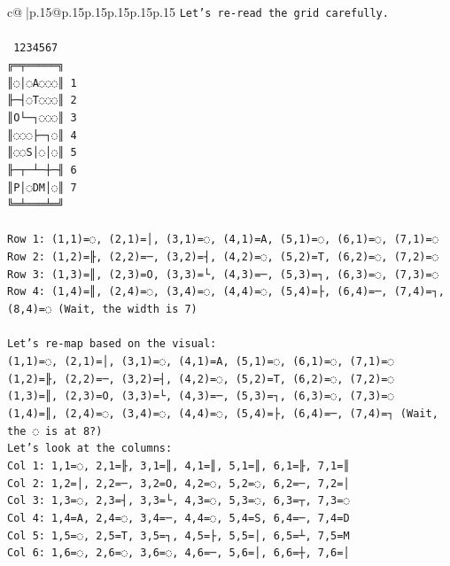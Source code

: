 \documentclass{article}
\begin{document}
{\begin{supertabular}{c@{$\;$}|p{.15\linewidth}@{}p{.15\linewidth}p{.15\linewidth}p{.15\linewidth}p{.15\linewidth}p{.15\linewidth}}
{{{\texttt{Let's re{-}read the grid carefully.} \\
\\ 
\texttt{ 1234567} \\
\texttt{╔═╤═════╗} \\
\texttt{║◌│◌A◌◌◌║ 1} \\
\texttt{╟─┤◌T◌◌◌║ 2} \\
\texttt{║O└─┐◌◌◌║ 3} \\
\texttt{║◌◌◌├─┐◌║ 4} \\
\texttt{║◌◌S│◌│◌║ 5} \\
\texttt{╟─┬─┴─┼─╢ 6} \\
\texttt{║P│◌DM│◌║ 7} \\
\texttt{╚═╧═══╧═╝} \\
\\ 
\texttt{Row 1: (1,1)=◌, (2,1)=│, (3,1)=◌, (4,1)=A, (5,1)=◌, (6,1)=◌, (7,1)=◌} \\
\texttt{Row 2: (1,2)=╟, (2,2)=─, (3,2)=┤, (4,2)=◌, (5,2)=T, (6,2)=◌, (7,2)=◌} \\
\texttt{Row 3: (1,3)=║, (2,3)=O, (3,3)=└, (4,3)=─, (5,3)=┐, (6,3)=◌, (7,3)=◌} \\
\texttt{Row 4: (1,4)=║, (2,4)=◌, (3,4)=◌, (4,4)=◌, (5,4)=├, (6,4)=─, (7,4)=┐, (8,4)=◌ (Wait, the width is 7)} \\
\\ 
\texttt{Let's re{-}map based on the visual:} \\
\texttt{(1,1)=◌, (2,1)=│, (3,1)=◌, (4,1)=A, (5,1)=◌, (6,1)=◌, (7,1)=◌} \\
\texttt{(1,2)=╟, (2,2)=─, (3,2)=┤, (4,2)=◌, (5,2)=T, (6,2)=◌, (7,2)=◌} \\
\texttt{(1,3)=║, (2,3)=O, (3,3)=└, (4,3)=─, (5,3)=┐, (6,3)=◌, (7,3)=◌} \\
\texttt{(1,4)=║, (2,4)=◌, (3,4)=◌, (4,4)=◌, (5,4)=├, (6,4)=─, (7,4)=┐ (Wait, the ◌ is at 8?)} \\
\texttt{Let's look at the columns:} \\
\texttt{Col 1: 1,1=◌, 2,1=╟, 3,1=║, 4,1=║, 5,1=║, 6,1=╟, 7,1=║} \\
\texttt{Col 2: 1,2=│, 2,2=─, 3,2=O, 4,2=◌, 5,2=◌, 6,2=─, 7,2=│} \\
\texttt{Col 3: 1,3=◌, 2,3=┤, 3,3=└, 4,3=◌, 5,3=◌, 6,3=┬, 7,3=◌} \\
\texttt{Col 4: 1,4=A, 2,4=◌, 3,4=─, 4,4=◌, 5,4=S, 6,4=─, 7,4=D} \\
\texttt{Col 5: 1,5=◌, 2,5=T, 3,5=┐, 4,5=├, 5,5=│, 6,5=┴, 7,5=M} \\
\texttt{Col 6: 1,6=◌, 2,6=◌, 3,6=◌, 4,6=─, 5,6=│, 6,6=┼, 7,6=│} \\
}}}
\end{supertabular}}
\end{document}
